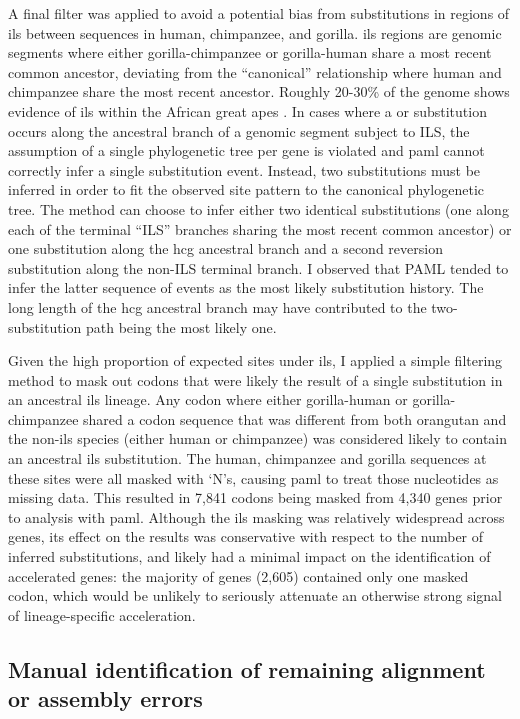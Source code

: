 A final filter was applied to avoid a potential bias from
substitutions in regions of \ac{ils} between sequences in human,
chimpanzee, and gorilla. \ac{ils} regions are genomic segments where
either gorilla-chimpanzee or gorilla-human share a most recent common
ancestor, deviating from the ``canonical'' relationship where human
and chimpanzee share the most recent ancestor. Roughly 20-30\% of the
genome shows evidence of \ac{ils} within the African great apes
\citep{Hobolth2007}. In cases where a \syn or \nsyn substitution
occurs along the ancestral branch of a genomic segment subject to ILS,
the assumption of a single phylogenetic tree per gene is violated and
\ac{paml} cannot correctly infer a single substitution event. Instead,
two substitutions must be inferred in order to fit the observed site
pattern to the canonical phylogenetic tree. The method can choose to
infer either two identical substitutions (one along each of the
terminal ``ILS'' branches sharing the most recent common ancestor) or
one substitution along the \ac{hcg} ancestral branch and a second
reversion substitution along the non-ILS terminal branch. I observed
that PAML tended to infer the latter sequence of events as the most
likely substitution history. The long length of the \ac{hcg} ancestral
branch may have contributed to the two-substitution path being the
most likely one.

Given the high proportion of expected sites under \ac{ils}, I applied
a simple filtering method to mask out codons that were likely the
result of a single substitution in an ancestral \ac{ils} lineage. Any
codon where either gorilla-human or gorilla-chimpanzee shared a codon
sequence that was different from both orangutan and the non-\ac{ils}
species (either human or chimpanzee) was considered likely to contain
an ancestral \ac{ils} substitution. The human, chimpanzee and gorilla
sequences at these sites were all masked with `N's, causing \ac{paml}
to treat those nucleotides as missing data. This resulted in 7,841
codons being masked from 4,340 genes prior to analysis with
\ac{paml}. Although the \ac{ils} masking was relatively widespread
across genes, its effect on the results was conservative with respect
to the number of inferred substitutions, and likely had a minimal
impact on the identification of accelerated genes: the majority of
genes (2,605) contained only one masked codon, which would be unlikely
to seriously attenuate an otherwise strong signal of lineage-specific
acceleration.

\subsection{Manual identification of remaining alignment or assembly errors}

